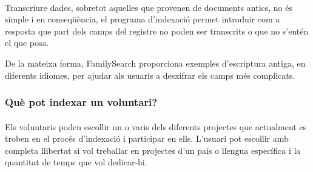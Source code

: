         \paragraph{}
        Transcriure dades, sobretot aquelles que provenen de documents antics, no és simple i en conseqüència, el programa d’indexació permet introduir com a resposta que part dels camps del registre no poden ser transcrits o que no s'entén el que posa.

        De la mateixa forma, FamilySearch proporciona exemples d’escriptura antiga, en diferents idiomes, per ajudar als usuaris a desxifrar els camps més complicats.


    \subsubsection{Què pot indexar un voluntari?}

        \paragraph{}
        Els voluntaris poden escollir un o varis dels diferents projectes que actualment es troben en el procés d’indexació i participar en ells. L’usuari pot escollir amb completa llibertat si vol treballar en projectes d’un país o llengua específica i la quantitat de temps que vol dedicar-hi.
